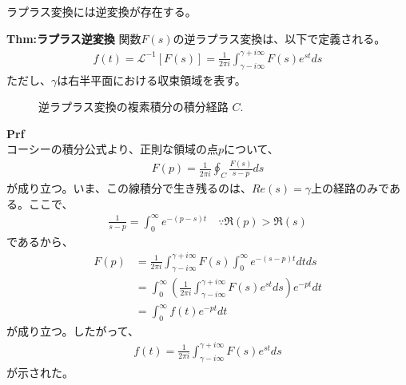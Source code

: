 \documentclass[a4paper,11pt]{jsarticle}
\numberwithin{equation}{section}
\begin{document}
ラプラス変換には逆変換が存在する。\\
\begin{itembox}[l]{\textbf{Thm:ラプラス逆変換}}
  関数$F(s)$の逆ラプラス変換は、以下で定義される。
  \begin{align}
    f(t) = \mathcal{L}^{-1}[F(s)] = \frac{1}{2\pi i} \int_{\gamma - i \infty}^{\gamma + i \infty}  F(s) e^{st} ds
  \end{align}
  ただし、$\gamma$は右半平面における収束領域を表す。

\end{itembox}
\begin{figure}[H]
  \centering
  \caption{逆ラプラス変換の複素積分の積分経路 $C$.}
  \end{figure}
\textbf{Prf}\\
コーシーの積分公式より、正則な領域の点$p$について、
\begin{align}
  F(p) = \frac{1}{2\pi i} \oint_C \frac{F(s)}{s-p} ds
\end{align}
が成り立つ。いま、この線積分で生き残るのは、$Re(s) = \gamma$上の経路のみである。ここで、
\begin{align}
  \frac{1}{s-p} = \int_{0}^{\infty} e^{-(p-s)t}  \quad \because \Re(p) > \Re(s)
\end{align}
であるから、
\begin{align}
  F(p) &= \frac{1}{2\pi i} \int_{\gamma - i \infty}^{\gamma + i \infty} F(s) \int_{0}^{\infty} e^{-(s-p)t} dt ds\\
  &= \int_{0}^{\infty} \left( \frac{1}{2\pi i} \int_{\gamma - i \infty}^{\gamma + i \infty} F(s) e^{st} ds \right) e^{-pt} dt\\
  &= \int_{0}^{\infty} f(t) e^{-pt} dt
\end{align}
が成り立つ。したがって、
\begin{align}
  f(t) = \frac{1}{2\pi i} \int_{\gamma - i \infty}^{\gamma + i \infty}  F(s) e^{st} ds
\end{align}
が示された。\hfill\qedsymbol\\
\end{document}
